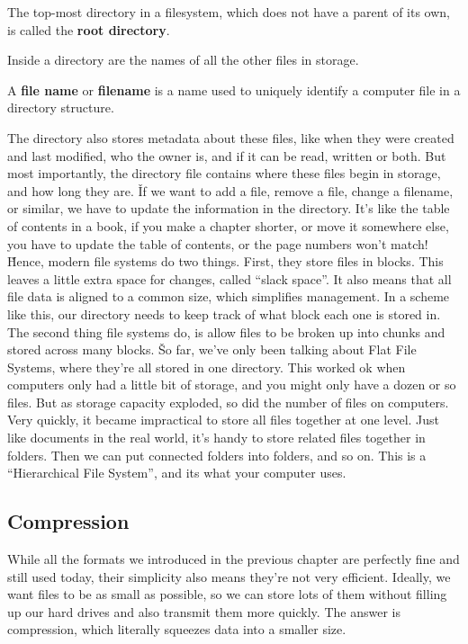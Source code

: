 The top-most directory in a filesystem, which does not have a parent of its own, is called the \textbf{root
directory}.
\ed

Inside a directory are the names of all the other files in storage.

A \textbf{file name} or \textbf{filename} is a name used to uniquely identify a computer file in a directory
structure.
\ed

The directory also stores metadata about these files, like when they were created and last modified, who the owner
is, and if it can be read, written or both. But most importantly, the directory file contains where these files begin
in storage, and how long they are. \v

If we want to add a file, remove a file, change a filename, or similar, we have to update the information in the
directory. It's like the table of contents in a book, if you make a chapter shorter, or move it somewhere else, you
have to update the table of contents, or the page numbers won't match! \v

Hence, modern file systems do two things. First, they store files in blocks. This leaves a little extra space for
changes, called ``slack space''. It also means that all file data is aligned to a common size, which simplifies
management. In a scheme like this, our directory needs to keep track of what block each one is stored in. The second
thing file systems do, is allow files to be broken up into chunks and stored across many blocks. \v

So far, we've only been talking about Flat File Systems, where they're all stored in one directory. This worked ok
when computers only had a little bit of storage, and you might only have a dozen or so files. But as storage capacity
exploded, so did the number of files on computers. Very quickly, it became impractical to store all files together at
one level. Just like documents in the real world, it's handy to store related files together in folders. Then we can
put connected folders into folders, and so on. This is a ``Hierarchical File System'', and its what your computer uses.

\subsection{Compression}

While all the formats we introduced in the previous chapter are perfectly fine and still used today, their simplicity
also means they're not very efficient. Ideally, we want files to be as small as possible, so we can store lots of
them without filling up our hard drives and also transmit them more quickly. The answer is compression, which
literally squeezes data into a smaller size.

